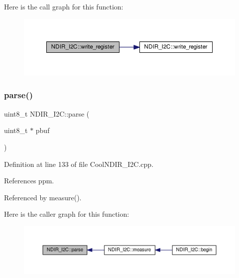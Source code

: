 Here is the call graph for this function\+:\nopagebreak
\begin{figure}[H]
\begin{center}
\leavevmode
\includegraphics[width=350pt]{d6/ddb/class_n_d_i_r___i2_c_a8ad2a76f9866b0a1f34810a147b4b20d_cgraph}
\end{center}
\end{figure}
\mbox{\label{class_n_d_i_r___i2_c_a907b756fc9244c7398b7d187b73cde94}} 
\subsubsection{\texorpdfstring{parse()}{parse()}}
{\footnotesize\ttfamily uint8\+\_\+t N\+D\+I\+R\+\_\+\+I2\+C\+::parse (\begin{DoxyParamCaption}\item[{uint8\+\_\+t $\ast$}]{pbuf }\end{DoxyParamCaption})\hspace{0.3cm}{\ttfamily [private]}}



Definition at line 133 of file Cool\+N\+D\+I\+R\+\_\+\+I2\+C.\+cpp.



References ppm.



Referenced by measure().

Here is the caller graph for this function\+:\nopagebreak
\begin{figure}[H]
\begin{center}
\leavevmode
\includegraphics[width=350pt]{d6/ddb/class_n_d_i_r___i2_c_a907b756fc9244c7398b7d187b73cde94_icgraph}
\end{center}
\end{figure}


